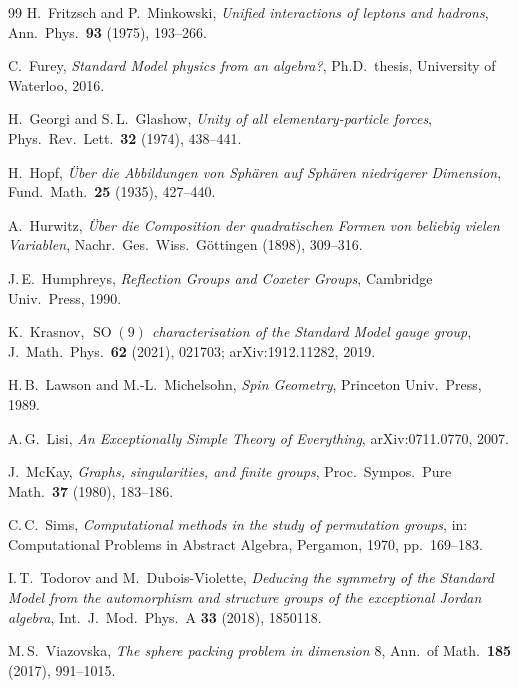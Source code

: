 \documentclass[11pt,reqno]{amsart}
\theoremstyle{plain}
\theoremstyle{definition}
\theoremstyle{remark}
\DeclareMathOperator{\SO}{SO}
\begin{document}
\begin{thebibliography}{99}
H.~Fritzsch and P.~Minkowski,
\emph{Unified interactions of leptons and hadrons},
Ann.\ Phys.\ \textbf{93} (1975), 193--266.

C.~Furey,
\emph{Standard Model physics from an algebra?},
Ph.D.\ thesis, University of Waterloo, 2016.

H.~Georgi and S.\,L.~Glashow,
\emph{Unity of all elementary-particle forces},
Phys.\ Rev.\ Lett.\ \textbf{32} (1974), 438--441.

H.~Hopf,
\emph{\"Uber die Abbildungen von Sph\"aren auf Sph\"aren
niedrigerer Dimension},
Fund.\ Math.\ \textbf{25} (1935), 427--440.

A.~Hurwitz,
\emph{\"Uber die Composition der quadratischen Formen von
beliebig vielen Variablen},
Nachr.\ Ges.\ Wiss.\ G\"ottingen (1898), 309--316.

J.\,E.~Humphreys,
\emph{Reflection Groups and Coxeter Groups},
Cambridge Univ.\ Press, 1990.

K.~Krasnov,
\emph{$\SO(9)$ characterisation of the Standard Model gauge group},
J.\ Math.\ Phys.\ \textbf{62} (2021), 021703;
arXiv:1912.11282, 2019.

H.\,B.~Lawson and M.-L.~Michelsohn,
\emph{Spin Geometry},
Princeton Univ.\ Press, 1989.

A.\,G.~Lisi,
\emph{An Exceptionally Simple Theory of Everything},
arXiv:0711.0770, 2007.

J.~McKay,
\emph{Graphs, singularities, and finite groups},
Proc.\ Sympos.\ Pure Math.\ \textbf{37} (1980), 183--186.

C.\,C.~Sims,
\emph{Computational methods in the study of permutation groups},
in: Computational Problems in Abstract Algebra,
Pergamon, 1970, pp.\ 169--183.

I.\,T.~Todorov and M.~Dubois-Violette,
\emph{Deducing the symmetry of the Standard Model from the
automorphism and structure groups of the exceptional Jordan
algebra},
Int.\ J.\ Mod.\ Phys.\ A \textbf{33} (2018), 1850118.

M.\,S.~Viazovska,
\emph{The sphere packing problem in dimension $8$},
Ann.\ of Math.\ \textbf{185} (2017), 991--1015.

\end{thebibliography}
\end{document}
